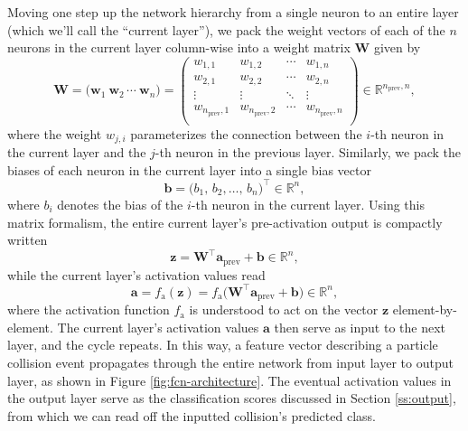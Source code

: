 \documentclass[11pt, a4paper]{article}
\renewcommand{\vec}[1]{\bm{#1}}
\newcommand{\mat}[1]{\mathbf{#1}}
\newcommand{\W}{\mat{W}}
\newcommand{\w}{\vec{w}}
\renewcommand{\b}{\vec{b}}
\newcommand{\z}{\vec{z}}
\renewcommand{\a}{\vec{a}}
\begin{document}
Moving one step up the network hierarchy from a single neuron to an entire layer (which we'll call the ``current layer''), we pack the weight vectors of each of the $ n $ neurons in the current layer column-wise into a weight matrix $ \W $ given by
\begin{equation*}
   \W = \Big( \w_{1} \ \w_{2} \, \cdots \ \w_{n} \Big) = 
    \begin{pmatrix}
        w_{1, 1} & w_{1, 2} & \cdots & w_{1, n}\\
        w_{2, 1} & w_{2, 2} & \cdots & w_{2, n}\\
        \vdots & \vdots & \ddots & \vdots\\
        w_{n_{\text{prev}}, 1} & w_{n_{\text{prev}}, 2} & \cdots & w_{n_{\text{prev}}, n}\\
    \end{pmatrix} \in \mathbb{R}^{n_{\text{prev}}, n},
\end{equation*} 
where the weight $ w_{j, i} $ parameterizes the connection between the $ i $-th neuron in the current layer and the $ j $-th neuron in the previous layer. Similarly, we pack the biases of each neuron in the current layer into a single bias vector
\begin{equation*}
    \b = \big( b_{1}, \, b_{2}, \ldots, \, b_{n} \big)^{\top} \in \mathbb{R}^{n},
\end{equation*} 
where $ b_{i} $ denotes the bias of the $ i $-th neuron in the current layer. Using this matrix formalism, the entire current layer's pre-activation output is compactly written
\begin{equation*}
    \vec{z} = \W^{\top} \a_{\text{prev}} + \b \in \mathbb{R}^{n},
\end{equation*}
while the current layer's activation values read
\begin{equation*}
    \a = f_{\text{a}}(\z) = f_{\text{a}} \Big( \W^{\top} \a_{\text{prev}} + \b\Big) \in \mathbb{R}^{n},
\end{equation*}
where the activation function $ f_{\text{a}} $ is understood to act on the vector $ \z $ element-by-element. The current layer's activation values $ \a $ then serve as input to the next layer, and the cycle repeats. In this way, a feature vector describing a particle collision event propagates through the entire network from input layer to output layer, as shown in Figure \ref{fig:fcn-architecture}. The eventual activation values in the output layer serve as the classification scores discussed in Section \ref{ss:output}, from which we can read off the inputted collision's predicted class.
\end{document}
